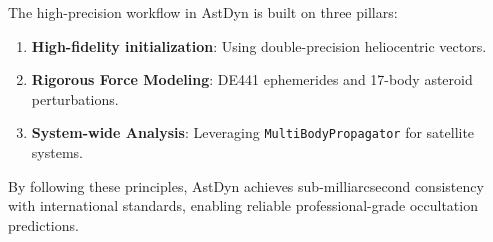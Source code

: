 The high-precision workflow in AstDyn is built on three pillars:
\begin{enumerate}
    \item \textbf{High-fidelity initialization}: Using double-precision heliocentric vectors.
    \item \textbf{Rigorous Force Modeling}: DE441 ephemerides and 17-body asteroid perturbations.
    \item \textbf{System-wide Analysis}: Leveraging \texttt{MultiBodyPropagator} for satellite systems.
\end{enumerate}

By following these principles, AstDyn achieves sub-milliarcsecond consistency with international standards, enabling reliable professional-grade occultation predictions.
